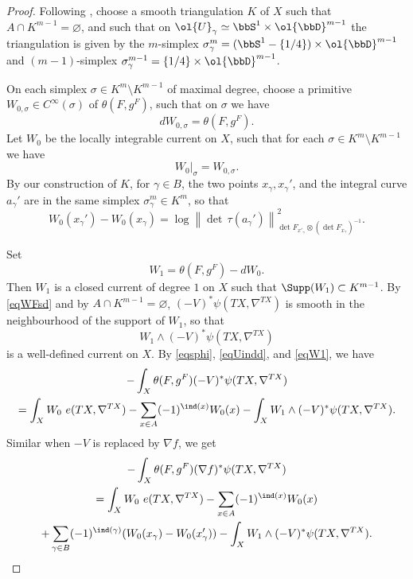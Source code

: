 \begin{proof}
Following \cite[\S IV.c)]{BZ92},
choose a smooth triangulation $K$ of $X$ such that $A\cap
K^{m-1}=\varnothing$, and such that on $\ol{U}_{\gamma}\simeq \bbS^{1}\times
\ol{\bbD}^{m-1}$ the
triangulation is given by the $m$-simplex
$\sigma^{m}_{\gamma}=(\bbS^{1}-\{1/4\})\times
\ol{\bbD}^{m-1}$ and $(m-1)$-simplex
$\sigma^{m-1}_{\gamma}=\{1/4\}\times \ol{\bbD}^{m-1}$.

On each simplex $\sigma\in K^{m}\setminus K^{m-1}$ of maximal degree, choose a
primitive $W_{0,\sigma}\in C^{\infty}(\sigma)$ of $\theta(F,g^{F})$,
such that on $\sigma$ we have
\begin{equation*}
dW_{0,\sigma}=\theta(F,g^{F}).
\end{equation*}
Let $W_{0}$ be the locally integrable current on $X$, such that
for each $\sigma\in K^{m}\setminus K^{m-1}$ we have
\begin{equation*}
W_{0}|_{\sigma}=W_{0,\sigma}.
\end{equation*}
By our construction of $K$, for $\gamma\in B$, the two points
$x_{\gamma},x_{\gamma}'$, and the integral curve $a_{\gamma}'$ are in the same simplex $\sigma^{m}_{\gamma}\in
K^{m}$, so that
\begin{equation}\label{W0W0}
W_{0}(x_{\gamma}')-W_{0}(x_{\gamma})=\log
\left\|{\det\,}\tau(a_{\gamma}')\right\|^{2}_{\det
F_{x'_{\gamma}}\otimes (\det
F_{x_{\gamma}})^{-1}}.
\end{equation}

Set
\begin{equation}\label{eqW1}
W_{1}=\theta(F,g^{F})-dW_{0}.
\end{equation}
Then $W_{1}$ is a closed
current of degree $1$ on $X$ such that $\Supp(W_{1})\subset
K^{m-1}$. By \eqref{eqWFsd} and by $A\cap K^{m-1}=\varnothing$, $(-V)^{*}\psi(TX,\nabla^{TX})$ is
smooth in the neighbourhood of the support of $W_{1}$, so that
\begin{equation*}
W_{1}\wedge (-V)^{*}\psi(TX,\nabla^{TX})
\end{equation*}
is a well-defined current on $X$. By \eqref{eqsphi}, \eqref{eqUindd}, and \eqref{eqW1}, we have
\begin{multline}\label{eqVtoW1}
-\int_{X}\theta(F,g^{F}) (-V)^{*}\psi(TX,\nabla^{TX})\\
=\int_{X}W_{0}\ e(TX,\nabla^{TX})
-\sum_{x\in A}(-1)^{\ind(x)}W_{0}(x)
-\int_{X}W_{1}\wedge (-V)^{*}\psi(TX,\nabla^{TX}).
\end{multline}
Similar when $-V$ is replaced by $\nabla f$, we get
\begin{multline}\label{eqnftoW1}
-\int_{X}\theta(F,g^{F}) (\nabla f)^{*}\psi(TX,\nabla^{TX})\\
=\int_{X}W_{0}\ e(TX,\nabla^{TX})
-\sum_{x\in A}(-1)^{\ind(x)}W_{0}(x)\\
+\sum_{\gamma\in
B}(-1)^{\ind(\gamma)}(W_{0}(x_{\gamma})-W_{0}(x_{\gamma}')) -\int_{X}W_{1}\wedge (-V)^{*}\psi(TX,\nabla^{TX}).
\end{multline}


\end{proof}
